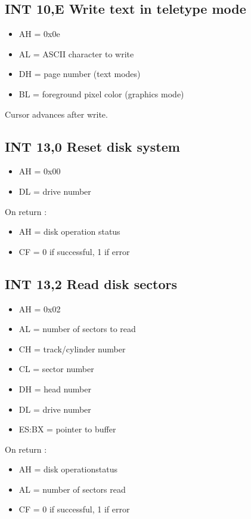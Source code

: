 \subsection{INT 10,E Write text in teletype mode}
\begin{itemize}
  \item{AH = 0x0e}
  \item{AL = ASCII character to write}
  \item{DH = page number (text modes)}
  \item{BL = foreground pixel color (graphics mode)}
\end{itemize}

Cursor advances after write.

%
%
\subsection{INT 13,0 Reset disk system}
\begin{itemize}
  \item{AH = 0x00}
  \item{DL = drive number}
\end{itemize}

On return :

\begin{itemize}
  \item{AH = disk operation status}
  \item{CF = 0 if successful, 1 if error}
\end{itemize}

\subsection{INT 13,2 Read disk sectors}
\begin{itemize}
  \item{AH = 0x02}
  \item{AL = number of sectors to read}
  \item{CH = track/cylinder number}
  \item{CL = sector number}
  \item{DH = head number}
  \item{DL = drive number}
  \item{ES:BX = pointer to buffer}
\end{itemize}

On return :

\begin{itemize}
  \item{AH = disk operationstatus}
  \item{AL = number of sectors read}
  \item{CF = 0 if successful, 1 if error}
\end{itemize}
%
%
